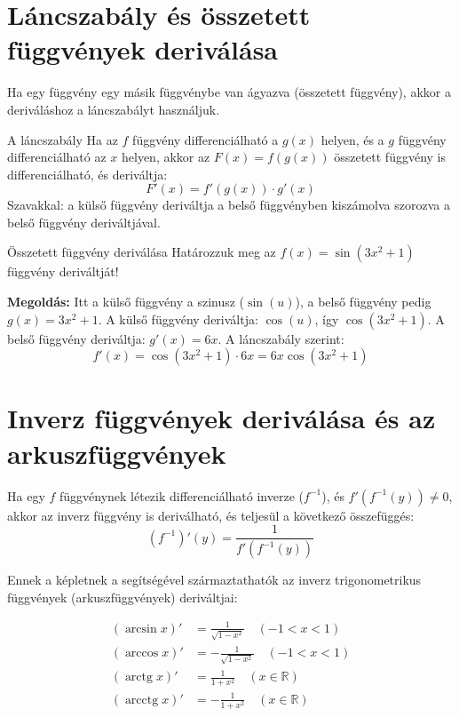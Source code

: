 \documentclass[11pt,a4paper]{article}
\begin{document}
\section{Láncszabály és összetett függvények deriválása}
Ha egy függvény egy másik függvénybe van ágyazva (összetett függvény), akkor a deriváláshoz a láncszabályt használjuk.

\begin{defbox}{A láncszabály}
Ha az $f$ függvény differenciálható a $g(x)$ helyen, és a $g$ függvény differenciálható az $x$ helyen, akkor az $F(x) = f(g(x))$ összetett függvény is differenciálható, és deriváltja:
\[
F'(x) = f'(g(x)) \cdot g'(x)
\]
Szavakkal: a külső függvény deriváltja a belső függvényben kiszámolva szorozva a belső függvény deriváltjával.
\end{defbox}

\begin{examplebox}{Összetett függvény deriválása}
Határozzuk meg az $f(x) = \sin(3x^2 + 1)$ függvény deriváltját!
\vspace{0.2cm}

\textbf{Megoldás:}
Itt a külső függvény a szinusz ($\sin(u)$), a belső függvény pedig $g(x) = 3x^2 + 1$.
A külső függvény deriváltja: $\cos(u)$, így $\cos(3x^2 + 1)$.
A belső függvény deriváltja: $g'(x) = 6x$.
A láncszabály szerint:
\[
f'(x) = \cos(3x^2 + 1) \cdot 6x = 6x \cos(3x^2 + 1)
\]
\end{examplebox}

\section{Inverz függvények deriválása és az arkuszfüggvények}
Ha egy $f$ függvénynek létezik differenciálható inverze ($f^{-1}$), és $f'(f^{-1}(y)) \neq 0$, akkor az inverz függvény is deriválható, és teljesül a következő összefüggés:
\[
(f^{-1})'(y) = \frac{1}{f'(f^{-1}(y))}
\]

Ennek a képletnek a segítségével származtathatók az inverz trigonometrikus függvények (arkuszfüggvények) deriváltjai:

\begin{align*}
    (\arcsin x)' &= \frac{1}{\sqrt{1 - x^2}} \quad (-1 < x < 1) \\
    (\arccos x)' &= -\frac{1}{\sqrt{1 - x^2}} \quad (-1 < x < 1) \\
    (\operatorname{arctg} x)' &= \frac{1}{1 + x^2} \quad (x \in \mathbb{R}) \\
    (\operatorname{arcctg} x)' &= -\frac{1}{1 + x^2} \quad (x \in \mathbb{R})
\end{align*}
\end{document}
